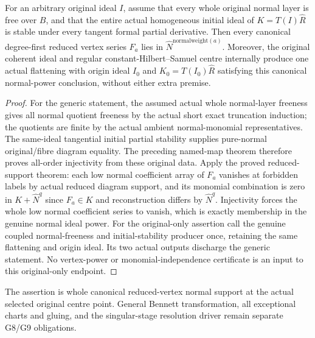 \begin{theorem}
\label{hir:actual-original-centre-reduced-normal-powers}
\leanok
For an arbitrary original ideal $I$, assume that every whole original normal layer is free over $B$, and that the entire actual homogeneous initial ideal of $K=T(I)\widehat R$ is stable under every tangent formal partial derivative. Then every canonical degree-first reduced vertex series $F_a$ lies in $\widehat N^{\mathrm{normalweight}(a)}$. Moreover, the original coherent ideal and regular constant-Hilbert--Samuel centre internally produce one actual flattening with origin ideal $I_0$ and $K_0=T(I_0)\widehat R$ satisfying this canonical normal-power conclusion, without either extra premise.
\end{theorem}
\begin{proof}
For the generic statement, the assumed actual whole normal-layer freeness gives all normal quotient freeness by the actual short exact truncation induction; the quotients are finite by the actual ambient normal-monomial representatives.
The same-ideal tangential initial partial stability supplies pure-normal original/fibre diagram equality.
The preceding named-map theorem therefore proves all-order injectivity from these original data.
Apply the proved reduced-support theorem: each low normal coefficient array of $F_a$ vanishes at forbidden labels by actual reduced diagram support, and its monomial combination is zero in $K+\widehat N^q$ since $F_a\in K$ and reconstruction differs by $\widehat N^q$.
Injectivity forces the whole low normal coefficient series to vanish, which is exactly membership in the genuine normal ideal power.
For the original-only assertion call the genuine coupled normal-freeness and initial-stability producer once, retaining the same flattening and origin ideal. Its two actual outputs discharge the generic statement. No vertex-power or monomial-independence certificate is an input to this original-only endpoint.
\end{proof}

The assertion is whole canonical reduced-vertex normal support at the actual selected original centre point.
General Bennett transformation, all exceptional charts and gluing, and the singular-stage resolution driver remain separate G8/G9 obligations.
